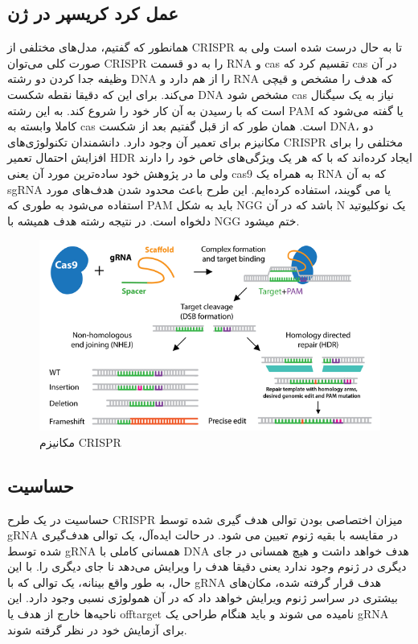 \documentclass[12pt,a4paper,BCOR=.7cm,headsepline,bibliography=totoc]{report}
\begin{document}
\subsection{عمل کرد کریسپر در ژن}
همانطور که گفتیم، مدل‌های مختلفی از CRISPR تا به حال درست شده است ولی به صورت کلی می‌توان CRISPR را به دو قسمت RNA و  cas تقسیم کرد که cas در آن وظیفه جدا کردن دو رشته DNA را از هم دارد و RNA که هدف را مشخص و قیچی می‌کند. برای این که دقیقا نقطه شکست DNA مشخص شود cas نیاز به یک سیگنال است که با رسیدن به آن کار خود را شروع کند. به این رشته PAM یا 
گفته می‌شود که کاملا وابسته به cas است. همان طور که از قبل گفتیم بعد از شکست DNA، دو مکانیزم برای تعمیر آن وجود دارد. دانشمندان تکنولوژی‌های CRISPR مختلفی را برای افزایش احتمال تعمیر HDR ایجاد کرده‌اند که با که هر یک ویژگی‌های خاص خود را دارند ولی ما در پژوهش خود ساده‌ترین مورد آن یعنی cas9 به همراه یک RNA که به آن sgRNA یا 
می گویند، استفاده کرده‌ایم. این طرح باعث محدود شدن هدف‌های مورد استفاده می‌شود به طوری که ‌PAM باید به شکل NGG باشد که در آن N یک نوکلیوتید دلخواه است. در نتیجه رشته هدف همیشه با NGG ختم میشود. 
\begin{figure}[!h]
\centering
\includegraphics[width=12cm, ]{pictures/cut.png}
\caption{
مکانیزم CRISPR
}\label{fig:2}
\end{figure}
 
\subsection{حساسیت}
حساسیت در یک طرح CRISPR میزان اختصاصی بودن توالی هدف گیری شده توسط gRNA در مقایسه با بقیه ژنوم تعیین می شود. در حالت ایده‌آل، یک توالی هدف‌گیری شده توسط gRNA همسانی کاملی با DNA هدف خواهد داشت و هیچ همسانی در جای دیگری در ژنوم وجود ندارد یعنی دقیقا هدف را ویرایش می‌دهد نا جای دیگری را. با این حال، به طور واقع بینانه، یک توالی که با gRNA هدف قرار گرفته شده، مکان‌های بیشتری در سراسر ژنوم ویرایش خواهد داد که در آن همولوژی نسبی وجود دارد. این ناحیه‌ها خارج از هدف یا offtarget نامیده می شوند و باید هنگام طراحی یک gRNA برای آزمایش خود در نظر گرفته شوند.
\end{document}
